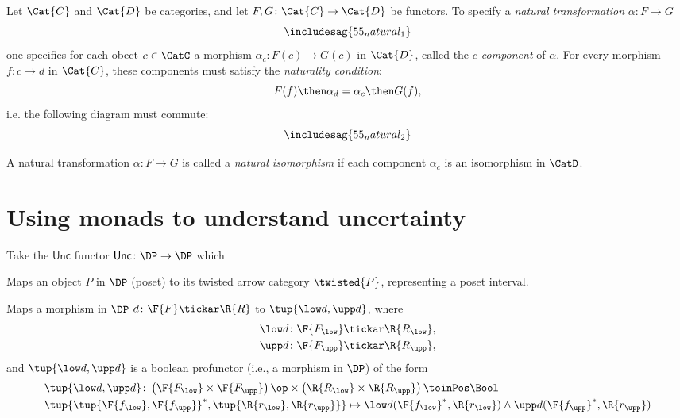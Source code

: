 

\begin{ctdefinition}
Let $\Cat{C}$ and $\Cat{D}$ be categories, and let $F,G\colon \Cat{C}\to \Cat{D}$ be functors. To specify a \emph{natural transformation} $\alpha\colon F\to G$
\begin{equation}
\includesag{55_natural_1}
\end{equation}
one specifies for each obect $c\in \CatC$ a morphism $\alpha_c\colon F(c)\to G(c)$ in $\Cat{D}$, called the $c$\emph{-component} of $\alpha$. For every morphism $f\colon c\to d$ in $\Cat{C}$, these components must satisfy the \emph{naturality condition}:
\begin{equation}
    F(f)\then \alpha_d = \alpha_c\then G(f),
\end{equation}
i.e. the following diagram must commute:
\begin{equation}
\includesag{55_natural_2}
\end{equation}
\end{ctdefinition}

\begin{ctdefinition}
\label{def:nat_iso}
A natural transformation $\alpha\colon F\to G$ is called a \emph{natural isomorphism} if each component $\alpha_c$ is an isomorphism in $\CatD$.
\end{ctdefinition}


\section{Using monads to understand uncertainty}

Take the $\mathsf{Unc}$ functor $\mathsf{Unc}\colon \DP\to \DP$ which 
\begin{compactenum}
    \item Maps an object $P$ in $\DP$ (poset) to its twisted arrow category $\twisted{P}$, representing a poset interval.
    \item Maps a morphism in $\DP$ $d\colon \F{F}\tickar \R{R}$ to $\tup{\low d,\upp d}$, where
    \begin{equation}
    \begin{aligned}
        \low d\colon \F{F_{\low}}&\tickar \R{R_{\low}},\\
        \upp d\colon \F{F_{\upp}}&\tickar \R{R_{\upp}},
    \end{aligned}
    \end{equation}
    and $\tup{\low d,\upp d}$ is a boolean profunctor (i.e., a morphism in $\DP$) of the form
    \begin{equation}
    \begin{aligned}
        &\tup{\low d,\upp d}\colon \left(\F{F_{\low}}\times \F{F_{\upp}} \right)\op \times \left(\R{R_{\low}}\times \R{R_{\upp}} \right)\toinPos \Bool\\
        &\tup{\tup{\F{f_{\low}},\F{f_{\upp}}}^*,\tup{\R{r_{\low}},\R{r_{\upp}}}}\mapsto \low d(\F{f_{\low}}^*,\R{r_{\low}})\wedge \upp d(\F{f_{\upp}}^*,\R{r_{\upp}})
    \end{aligned}
    \end{equation}
\end{compactenum}

